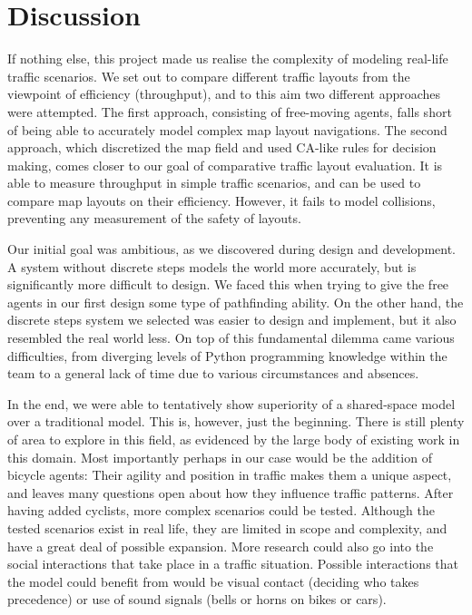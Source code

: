 \chapter{Discussion} \label{chap:discussion}

If nothing else, this project made us realise the complexity of modeling real-life traffic scenarios. We set out to compare different traffic layouts from the viewpoint of efficiency (throughput), and to this aim two different approaches were attempted. The first approach, consisting of free-moving agents, falls short of being able to accurately model complex map layout navigations. The second approach, which discretized the map field and used CA-like rules for decision making, comes closer to our goal of comparative traffic layout evaluation. It is able to measure throughput in simple traffic scenarios, and can be used to compare map layouts on their efficiency. However, it fails to model collisions, preventing any measurement of the safety of layouts.

Our initial goal was ambitious, as we discovered during design and development. A system without discrete steps models the world more accurately, but is significantly more difficult to design. We faced this when trying to give the free agents in our first design some type of pathfinding ability. On the other hand, the discrete steps system we selected was easier to design and implement, but it also resembled the real world less. On top of this fundamental dilemma came various difficulties, from diverging levels of Python programming knowledge within the team to a general lack of time due to various circumstances and absences.

In the end, we were able to tentatively show superiority of a shared-space model over a traditional model. This is, however, just the beginning. There is still plenty of area to explore in this field, as evidenced by the large body of existing work in this domain. Most importantly perhaps in our case would be the addition of bicycle agents: Their agility and position in traffic makes them a unique aspect, and leaves many questions open about how they influence traffic patterns. After having added cyclists, more complex scenarios could be tested. Although the tested scenarios exist in real life, they are limited in scope and complexity, and have a great deal of possible expansion. More research could also go into the social interactions that take place in a traffic situation. Possible interactions that the model could benefit from would be visual contact (deciding who takes precedence) or use of sound signals (bells or horns on bikes or cars).


